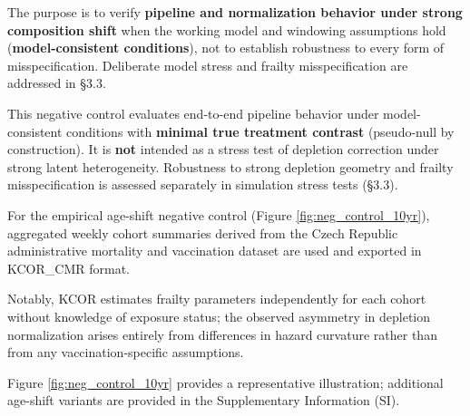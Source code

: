 \documentclass[
]{article}
\begin{document}
The purpose is to verify \textbf{pipeline and normalization behavior
under strong composition shift} when the working model and windowing
assumptions hold (\textbf{model-consistent conditions}), not to
establish robustness to every form of misspecification. Deliberate model
stress and frailty misspecification are addressed in §3.3.

This negative control evaluates end-to-end pipeline behavior under
model-consistent conditions with \textbf{minimal true treatment
contrast} (pseudo-null by construction). It is \textbf{not} intended as
a stress test of depletion correction under strong latent heterogeneity.
Robustness to strong depletion geometry and frailty misspecification is
assessed separately in simulation stress tests (§3.3).

For the empirical age-shift negative control (Figure
\ref{fig:neg_control_10yr}), aggregated weekly cohort summaries derived
from the Czech Republic administrative mortality and vaccination dataset
are used and exported in KCOR\_CMR format.

Notably, KCOR estimates frailty parameters independently for each cohort
without knowledge of exposure status; the observed asymmetry in
depletion normalization arises entirely from differences in hazard
curvature rather than from any vaccination-specific assumptions.

Figure \ref{fig:neg_control_10yr} provides a representative
illustration; additional age-shift variants are provided in the
Supplementary Information (SI).
\end{document}
